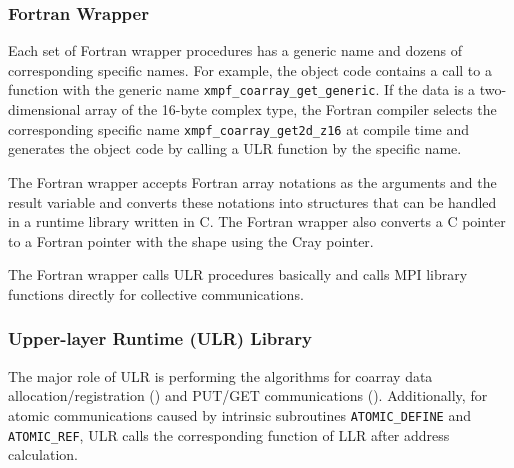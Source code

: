 \subsubsection{Fortran Wrapper}

Each set of Fortran wrapper procedures has a generic name and dozens of corresponding specific names. For example, the object code contains a call to a function with
the generic name {\tt xmpf\_coarray\_get\_generic}.
If the data is a two-dimensional array of the 16-byte complex type,
the Fortran compiler selects the corresponding specific name 
{\tt xmpf\_coarray\_get2d\_z16} at compile time
and generates the object code by calling a ULR function 
by the specific name.

The Fortran wrapper accepts Fortran array notations as the arguments 
and the result variable and converts these notations into structures that can be handled in a runtime library written in C.
%
The Fortran wrapper also converts a C pointer to a Fortran pointer with the shape using
the Cray pointer.

The Fortran wrapper calls ULR procedures basically and 
calls MPI library functions directly for collective communications. 






\subsubsection{Upper-layer Runtime (ULR) Library }

The major role of ULR is performing the algorithms for coarray data
allocation/registration () and PUT/GET communications ().
Additionally, for atomic communications caused by intrinsic subroutines
{\tt ATOMIC\_DEFINE} and {\tt ATOMIC\_REF}, 
ULR calls the corresponding function of LLR after address calculation.

